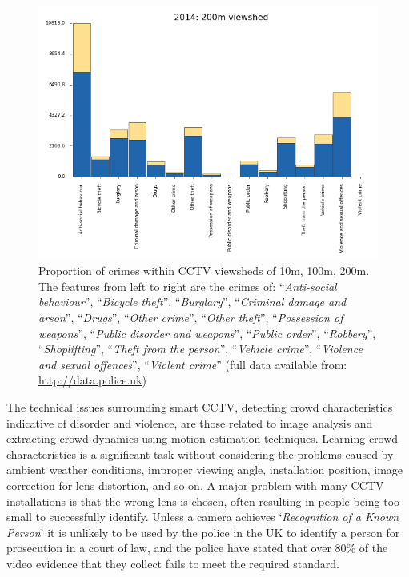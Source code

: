 \documentclass[conference]{IEEEtran}
\begin{document}
\begin{figure}[!htp]
\includegraphics[width=\columnwidth]{images/2014-200m.png}
\caption{Proportion of crimes within CCTV viewsheds of 10m, 100m,
  200m. The features from left to right are the crimes of:
``{\emph{Anti-social behaviour}}'', ``{\emph{Bicycle theft}}'',
``{\emph{Burglary}}'', ``{\emph{Criminal damage and arson}}'',
``{\emph{Drugs}}'', ``{\emph{Other crime}}'', ``{\emph{Other
theft}}'', ``{\emph{Possession of weapons}}'', ``{\emph{Public
disorder and weapons}}'', ``{\emph{Public order}}'',
``{\emph{Robbery}}'', ``{\emph{Shoplifting}}'', ``{\emph{Theft from
the person}}'', ``{\emph{Vehicle crime}}'', ``{\emph{Violence and
sexual offences}}'', ``{\emph{Violent crime}}'' (full data available
from: \protect\url{http://data.police.uk})}
\label{fig:cctvcrimes}
\end{figure}

The technical issues surrounding smart CCTV, detecting crowd
characteristics indicative of disorder and violence, are those related
to image analysis and extracting crowd dynamics using motion
estimation techniques. Learning crowd characteristics is a significant
task without considering the problems caused by ambient weather
conditions, improper viewing angle, installation position, image
correction for lens distortion, and so on.  A major problem with many
CCTV installations is that the wrong lens is chosen, often resulting
in people being too small to successfully identify. Unless a camera
achieves `{\emph{Recognition of a Known Person}}' it is unlikely to be
used by the police in the UK to identify a person for prosecution in a
court of law, and the police have stated that over 80\% of the video
evidence that they collect fails to meet the required standard.
\end{document}
